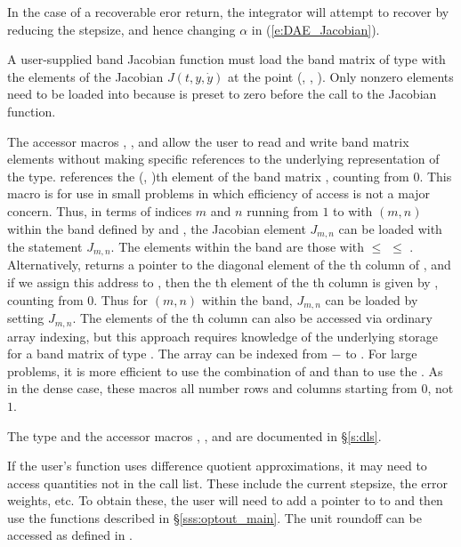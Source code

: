 {{  In the case of a recoverable eror return, 
  the integrator will attempt to recover by reducing the stepsize,
  and hence changing $\alpha$ in (\ref{e:DAE_Jacobian}).
}
{
  A user-supplied band Jacobian function must load the band matrix 
  of type  with the elements of the Jacobian $J(t,y,\dot{y})$ at the
  point (, , ).  Only nonzero elements need to be loaded into
   because  is preset to zero before the call to the
  Jacobian function.  

  The accessor macros , , and  
  allow the user to read and write band matrix elements without making specific 
  references to the underlying representation of the  type.
   references the (, )th element of the 
  band matrix , counting from $0$.
  This macro is for use in small problems in which efficiency of access is not
  a major concern.  Thus, in terms of indices $m$ and $n$ running from $1$ to
   with $(m,n)$ within the band defined by  and
  , the Jacobian element $J_{m,n}$ can be loaded with the 
  statement  $J_{m,n}$. The elements within
  the band are those with  $\le$  $\le$ .
  Alternatively,  returns a pointer to the diagonal element
  of the th column of , and if we assign this address to 
  , then the th element of the th column is
  given by , counting from $0$.
  Thus for $(m,n)$ within the band, $J_{m,n}$ can be loaded by setting 
    $J_{m,n}$.
  The elements of the th column can also be accessed
  via ordinary array indexing, but this approach requires knowledge of
  the underlying storage for a band matrix of type .  
  The array  can be indexed from $-$ to .
  For large problems, it is more efficient to use the combination of
   and  than to use the
  .  As in the dense case, these macros all number rows
  and columns starting from $0$, not $1$.  

  The  type and the accessor macros , , and
   are documented in \S\ref{s:dls}.

  If the user's  function uses difference quotient
  approximations, it may need to access quantities not in the call
  list. These include the current stepsize, the error weights, etc.
  To obtain these, the user will need to add a pointer to  
  to  and then use the  functions described in
  \S\ref{sss:optout_main}. The unit roundoff can be accessed as
   defined in .

}}

